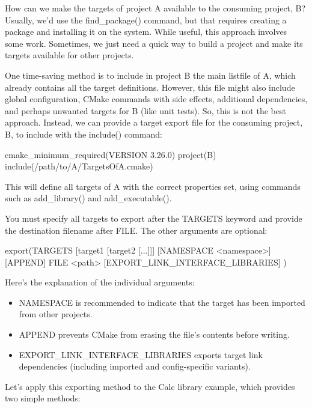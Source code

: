 How can we make the targets of project A available to the consuming project, B? Usually, we’d use the find\_package() command, but that requires creating a package and installing it on the system. While useful, this approach involves some work. Sometimes, we just need a quick way to build a project and make its targets available for other projects.

One time-saving method is to include in project B the main listfile of A, which already contains all the target definitions. However, this file might also include global configuration, CMake commands with side effects, additional dependencies, and perhaps unwanted targets for B (like unit tests). So, this is not the best approach. Instead, we can provide a target export file for the consuming project, B, to include with the include() command:

\begin{cmake}
cmake_minimum_required(VERSION 3.26.0)
project(B)
include(/path/to/A/TargetsOfA.cmake)
\end{cmake}

This will define all targets of A with the correct properties set, using commands such as add\_library() and add\_executable().

You must specify all targets to export after the TARGETS keyword and provide the destination filename after FILE. The other arguments are optional:

\begin{shell}
export(TARGETS [target1 [target2 [...]]]
       [NAMESPACE <namespace>] [APPEND] FILE <path>
       [EXPORT_LINK_INTERFACE_LIBRARIES]
)
\end{shell}

Here’s the explanation of the individual arguments:

\begin{itemize}
\item
NAMESPACE is recommended to indicate that the target has been imported from other projects.

\item
APPEND prevents CMake from erasing the file’s contents before writing.

\item
EXPORT\_LINK\_INTERFACE\_LIBRARIES exports target link dependencies (including imported and config-specific variants).
\end{itemize}

Let’s apply this exporting method to the Calc library example, which provides two simple methods:

